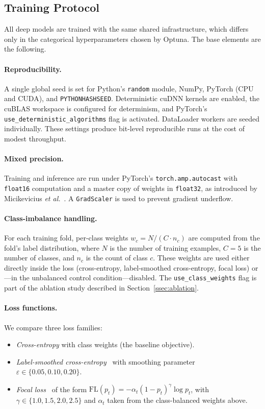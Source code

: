 \documentclass[conference]{IEEEtran}
\begin{document}
\subsection{Training Protocol}
\label{ssec:training}

All deep models are trained with the same shared infrastructure, which differs only in the categorical hyperparameters chosen by Optuna. The base elements are the following.

\paragraph{Reproducibility.}
A single global seed is set for Python's \texttt{random} module, NumPy, PyTorch (CPU and CUDA), and \texttt{PYTHONHASHSEED}. Deterministic cuDNN kernels are enabled, the cuBLAS workspace is configured for determinism, and PyTorch's \texttt{use\_deterministic\_algorithms} flag is activated. DataLoader workers are seeded individually. These settings produce bit-level reproducible runs at the cost of modest throughput.

\paragraph{Mixed precision.}
Training and inference are run under PyTorch's \texttt{torch.amp.autocast} with \texttt{float16} computation and a master copy of weights in \texttt{float32}, as introduced by Micikevicius \emph{et al.}~\cite{micikevicius2018mixed}. A \texttt{GradScaler} is used to prevent gradient underflow.

\paragraph{Class-imbalance handling.}
For each training fold, per-class weights $w_c = N / (C \cdot n_c)$ are computed from the fold's label distribution, where $N$ is the number of training examples, $C=5$ is the number of classes, and $n_c$ is the count of class $c$. These weights are used either directly inside the loss (cross-entropy, label-smoothed cross-entropy, focal loss) or---in the unbalanced control condition---disabled. The \texttt{use\_class\_weights} flag is part of the ablation study described in Section~\ref{ssec:ablation}.

\paragraph{Loss functions.}
We compare three loss families:
\begin{itemize}
  \item \emph{Cross-entropy} with class weights (the baseline objective).
  \item \emph{Label-smoothed cross-entropy}~\cite{szegedy2016label} with smoothing parameter $\varepsilon \in \{0.05, 0.10, 0.20\}$.
  \item \emph{Focal loss}~\cite{lin2017focal} of the form
        $\mathrm{FL}(p_t) = -\alpha_t (1-p_t)^{\gamma} \log p_t$,
        with $\gamma \in \{1.0, 1.5, 2.0, 2.5\}$ and $\alpha_t$ taken from the class-balanced weights above.
\end{itemize}
\end{document}
